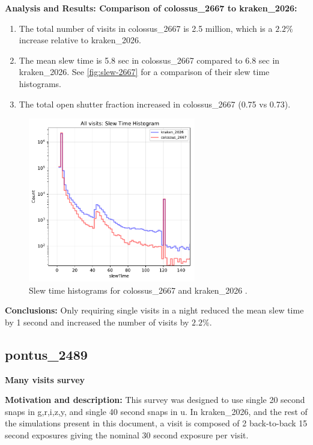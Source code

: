 \documentclass[DM,authoryear,toc]{lsstdoc}
\begin{document}
\textbf{Analysis and Results: Comparison of colossus\_2667 to kraken\_2026:}

\begin{enumerate}
\item The total number of visits in colossus\_2667 is 2.5 million, which is a $2.2\%$ increase relative to kraken\_2026.
\item The mean slew time is 5.8 sec in colossus\_2667 compared to 6.8 sec in kraken\_2026.
See \autoref{fig:slew-2667} for a comparison of their slew time histograms.
\item The total open shutter fraction increased in colossus\_2667 (0.75 vs 0.73).
\end{enumerate}

\begin{figure}[ht]
\centering
\includegraphics[width=0.65\textwidth]{figures/kraken_2026_colossus_2667_Slew_Time_Histogram_All_visits_ONED_ComboBinnedData.pdf}
\caption{Slew time histograms for colossus\_2667 and kraken\_2026 .}
\label{fig:slew-2667}
\end{figure}

\textbf{Conclusions:} Only requiring single visits in a night reduced the mean slew time by 1 second and increased the number of
visits by $2.2\%$.

\subsection{pontus\_2489} \label{pontus2489}

\textbf{Many visits survey}

\textbf{Motivation and description:} This survey was designed to use single 20 second snaps in
g,r,i,z,y, and single 40 second snaps in u. In kraken\_2026, and the rest of the simulations present in this document,
a visit is composed of 2 back-to-back 15 second exposures giving the nominal 30 second exposure per visit.
\end{document}
